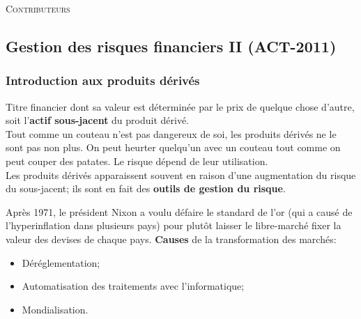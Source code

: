 \documentclass[10pt, french]{article}
\begin{document}
\begin{center}
	\textsc{\Large Contributeurs}\\[0.5cm] 
\end{center}


\newpage
\raggedcolumns

\begin{multicols*}{2}
\part{Gestion des risques financiers II (ACT-2011)}

\section{Introduction aux produits dérivés}

\begin{definitionNOHFILL}
Titre financier dont sa valeur est déterminée par le prix de quelque chose d'autre, soit l'\textbf{actif sous-jacent} du produit dérivé.\\

Tout comme un couteau n'est pas dangereux de soi, les produits dérivés ne le sont pas non plus. On peut heurter quelqu'un avec un couteau tout comme on peut couper des patates. Le risque dépend de leur utilisation.\\

Les produits dérivés apparaissent souvent en raison d'une augmentation du risque du sous-jacent; ils sont en fait des \textbf{outils de gestion du risque}.
\end{definitionNOHFILL}

\begin{rappel_enhanced}[Origine]
Après 1971, le président Nixon a voulu défaire le standard de l'or (qui a causé de l'hyperinflation dans plusieurs pays) pour plutôt laisser le libre-marché fixer la valeur des devises de chaque pays.
\tcbline
\textbf{Causes} de la transformation des marchés:
\begin{itemize}[leftmargin = *]
	\item	Déréglementation;
	\item	Automatisation des traitements avec l'informatique;
	\item	Mondialisation.
\end{itemize}
\end{rappel_enhanced}


\end{multicols*}
\end{document}
